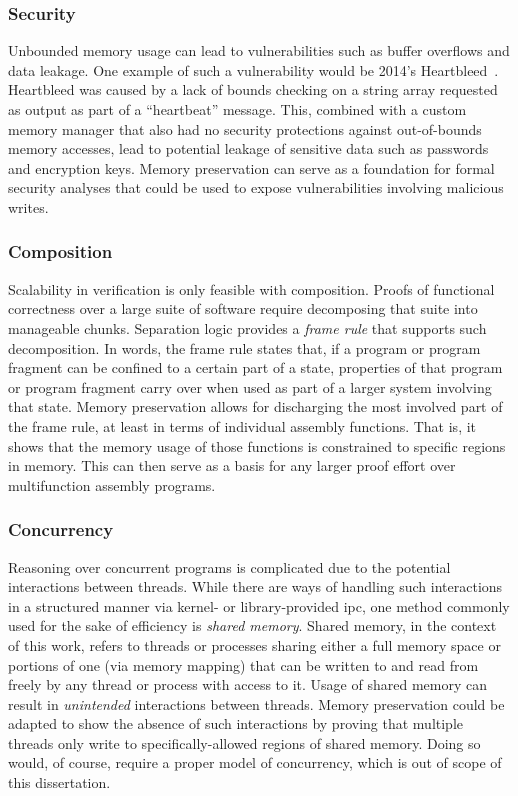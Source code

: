\subsubsection{Security}
Unbounded memory usage can lead to vulnerabilities
such as buffer overflows and data leakage.
One example of such a vulnerability would be 2014's Heartbleed~\citep{heartbleed}.
Heartbleed was caused by a lack of bounds checking on a string array
requested as output as part of a ``heartbeat'' message.
This, combined with a custom memory manager
that also had no security protections against out-of-bounds memory accesses,
lead to potential leakage of sensitive data such as passwords and encryption keys.
Memory preservation can serve as a foundation for formal security analyses
that could be used to expose vulnerabilities involving malicious writes.

\subsubsection{Composition}
Scalability in verification is only feasible with composition.
Proofs of functional correctness over a large suite of software
require decomposing that suite into manageable chunks.
Separation logic provides a \emph{frame rule} that supports such decomposition\cite{reynolds2002separation}.
In words, the frame rule states that,
if a program or program fragment can be confined to a certain part of a state,
properties of that program or program fragment carry over
when used as part of a larger system involving that state.
Memory preservation allows for discharging the most involved part of the frame rule,
at least in terms of individual assembly functions.
That is, it shows that the memory usage of those functions is constrained
to specific regions in memory.
This can then serve as a basis
for any larger proof effort over multifunction assembly programs.

\subsubsection{Concurrency}
Reasoning over concurrent programs is complicated
due to the potential interactions between threads.
While there are ways of handling such interactions in a structured manner
via kernel- or library-provided \ac{ipc},
one method commonly used for the sake of efficiency is \emph{shared memory}.
Shared memory, in the context of this work,
refers to threads or processes sharing either a full memory space
or portions of one (via memory mapping)
that can be written to and read from freely by any thread or process with access to it.
Usage of shared memory can result in \emph{unintended} interactions between threads.
Memory preservation could be adapted to show the absence of such interactions
by proving that multiple threads only write
to specifically-allowed regions of shared memory.
Doing so would, of course, require a proper model of concurrency,
which is out of scope of this dissertation.

